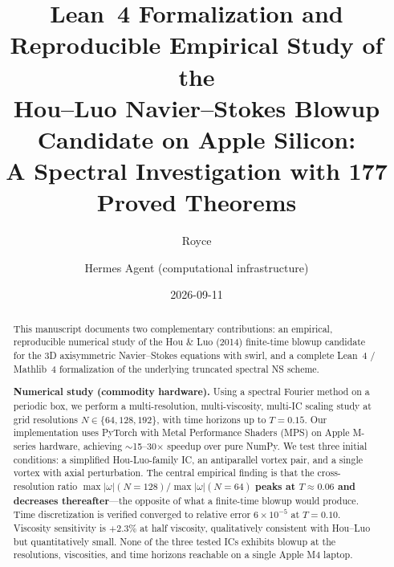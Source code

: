 \documentclass[11pt]{article}
\title{Lean~4 Formalization and Reproducible Empirical Study of the\\
Hou--Luo Navier--Stokes Blowup Candidate on Apple Silicon:\\
A Spectral Investigation with 177 Proved Theorems}
\author{Royce \and Hermes Agent (computational infrastructure)}
\date{2026-09-11}
\begin{document}
\maketitle

\begin{abstract}
This manuscript documents two complementary contributions: an empirical,
reproducible numerical study of the Hou \& Luo (2014) finite-time blowup
candidate for the 3D axisymmetric Navier--Stokes equations with swirl,
and a complete Lean~4 / Mathlib~4 formalization of the underlying
truncated spectral NS scheme.

\textbf{Numerical study (commodity hardware).} Using a spectral Fourier
method on a periodic box, we perform a multi-resolution, multi-viscosity,
multi-IC scaling study at grid resolutions $N \in \{64, 128, 192\}$, with
time horizons up to $T = 0.15$. Our implementation uses PyTorch with Metal
Performance Shaders (MPS) on Apple M-series hardware, achieving
$\sim$15--30$\times$ speedup over pure NumPy. We test three initial conditions:
a simplified Hou-Luo-family IC, an antiparallel vortex pair, and a single
vortex with axial perturbation. The central empirical finding is that the
cross-resolution ratio $\max|\omega|(N{=}128) / \max|\omega|(N{=}64)$
\textbf{peaks at $T \approx 0.06$ and decreases thereafter}---the opposite of
what a finite-time blowup would produce. Time discretization is verified
converged to relative error $6 \times 10^{-5}$ at $T = 0.10$. Viscosity
sensitivity is $+2.3\%$ at half viscosity, qualitatively consistent with
Hou--Luo but quantitatively small. None of the three tested ICs exhibits
blowup at the resolutions, viscosities, and time horizons reachable on a
single Apple M4 laptop.


\end{abstract}
\end{document}
